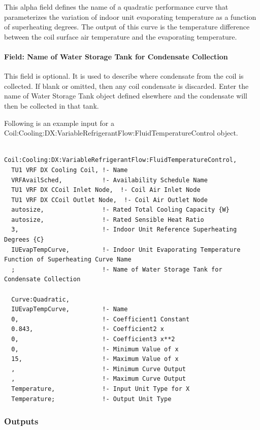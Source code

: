 This alpha field defines the name of a quadratic performance curve that parameterizes the variation of indoor unit evaporating temperature as a function of superheating degrees. The output of this curve is the temperature difference between the coil surface air temperature and the evaporating temperature.

\paragraph{Field: Name of Water Storage Tank for Condensate Collection}\label{field-name-of-water-storage-tank-for-condensate-collection-1}

This field is optional. It is used to describe where condensate from the coil is collected. If blank or omitted, then any coil condensate is discarded. Enter the name of Water Storage Tank object defined elsewhere and the condensate will then be collected in that tank.

Following is an example input for a Coil:Cooling:DX:VariableRefrigerantFlow:FluidTemperatureControl object.

\begin{lstlisting}

Coil:Cooling:DX:VariableRefrigerantFlow:FluidTemperatureControl,
  TU1 VRF DX Cooling Coil, !- Name
  VRFAvailSched,           !- Availability Schedule Name
  TU1 VRF DX CCoil Inlet Node,  !- Coil Air Inlet Node
  TU1 VRF DX CCoil Outlet Node,  !- Coil Air Outlet Node
  autosize,                !- Rated Total Cooling Capacity {W}
  autosize,                !- Rated Sensible Heat Ratio
  3,                       !- Indoor Unit Reference Superheating Degrees {C}
  IUEvapTempCurve,         !- Indoor Unit Evaporating Temperature Function of Superheating Curve Name
  ;                        !- Name of Water Storage Tank for Condensate Collection

  Curve:Quadratic,
  IUEvapTempCurve,         !- Name
  0,                       !- Coefficient1 Constant
  0.843,                   !- Coefficient2 x
  0,                       !- Coefficient3 x**2
  0,                       !- Minimum Value of x
  15,                      !- Maximum Value of x
  ,                        !- Minimum Curve Output
  ,                        !- Maximum Curve Output
  Temperature,             !- Input Unit Type for X
  Temperature;             !- Output Unit Type
\end{lstlisting}

\subsubsection{Outputs}\label{outputs-7-003}

